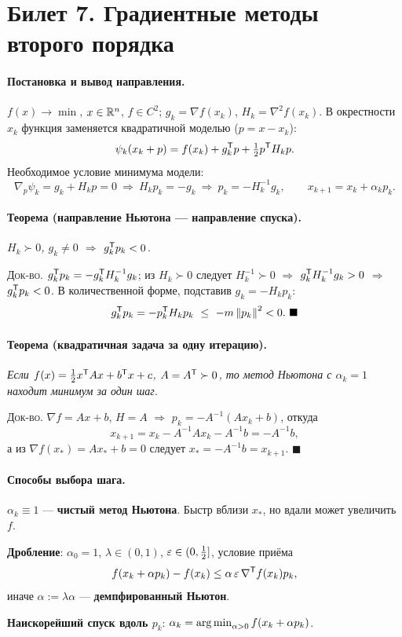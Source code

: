 \section{Билет 7. Градиентные методы второго порядка}


\paragraph{Постановка и вывод направления.}
$f(x) \to \min$, $x \in \mathbb{R}^n$, $f \in C^2$; $g_k = \nabla f(x_k)$,
$H_k = \nabla^2 f(x_k)$. В окрестности $x_k$ функция заменяется квадратичной
моделью ($p = x - x_k$):
\[
  \psi_k(x_k + p) = f(x_k) + g_k^{\mathsf{T}} p + \tfrac12 p^{\mathsf{T}} H_k p .
\]
Необходимое условие минимума модели:
\[
  \nabla_p \psi_k = g_k + H_k p = 0
  \ \Rightarrow\ H_k p_k = -g_k
  \ \Rightarrow\ p_k = -H_k^{-1} g_k ,
  \qquad x_{k+1} = x_k + \alpha_k p_k .
\]

\paragraph{Теорема (направление Ньютона — направление спуска).}
\textit{$H_k \succ 0$, $g_k \ne 0$ $\Rightarrow$ $g_k^{\mathsf{T}} p_k < 0$.}

\textsc{Док-во.} $g_k^{\mathsf{T}} p_k = -g_k^{\mathsf{T}} H_k^{-1}g_k$; из $H_k \succ 0$ следует
$H_k^{-1} \succ 0$ $\Rightarrow$ $g_k^{\mathsf{T}} H_k^{-1}g_k > 0$ $\Rightarrow$
$g_k^{\mathsf{T}} p_k < 0$. В количественной форме, подставив $g_k = -H_kp_k$:
\[
  g_k\T p_k = -p_k\T H_k p_k \ \le\ -m\norm{p_k}^2 < 0 . \ \blacksquare
\]

\paragraph{Теорема (квадратичная задача за одну итерацию).}
\textit{Если $f(x) = \tfrac12 x^{\mathsf{T}} A x + b^{\mathsf{T}} x + c$, $A = A^{\mathsf{T}} \succ 0$, то
метод Ньютона с $\alpha_k = 1$ находит минимум за один шаг.}

\textsc{Док-во.} $\nabla f = Ax + b$, $H = A$ $\Rightarrow$
$p_k = -A^{-1}(Ax_k + b)$, откуда
\[
  x_{k+1} = x_k - A^{-1}Ax_k - A^{-1}b = -A^{-1}b ,
\]
а из $\nabla f(x_*) = Ax_* + b = 0$ следует $x_* = -A^{-1}b = x_{k+1}$.
$\blacksquare$

\paragraph{Способы выбора шага.}
\begin{csteps}
  \item $\alpha_k \equiv 1$ — \textbf{чистый метод Ньютона}. Быстр вблизи
        $x_*$, но вдали может увеличить $f$.
  \item \textbf{Дробление}: $\alpha_0 = 1$, $\lambda \in (0,1)$,
        $\varepsilon \in (0, \tfrac12]$, условие приёма
        \[
          f(x_k + \alpha p_k) - f(x_k) \le \alpha\,\varepsilon\,\nabla^{\mathsf{T}} f(x_k)p_k ,
        \]
        иначе $\alpha := \lambda\alpha$ — \textbf{демпфированный Ньютон}.
  \item \textbf{Наискорейший спуск вдоль $p_k$}:
        $\alpha_k = \operatorname*{arg\,min}_{\alpha>0} f(x_k + \alpha p_k)$.
\end{csteps}

